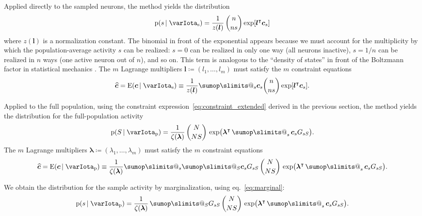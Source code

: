 \documentclass[\ifafour a4paper,12pt,\else a5paper,10pt,\fi%
onecolumn,oneside,article,%
british%
]{memoir}
\makeatletter
\theoremstyle{remark}
\theoremstyle{innote}
\def\sum{\DOTSI\sumop\slimits@}
\newcommand*{\citep}{\parencites}
\newcommand*{\defd}{\coloneqq}
\newcommand*{\pf}{\mathrm{p}}%
\newcommand*{\E}{\mathrm{E}}
\renewcommand*{\|}{\nonscript\,\vert\nonscript\;\mathopen{}}
\newcommand*{\chap}{ch.}%
\newcommand*{\eqn}{eq.}%
\newcommand*{\tsum}{\mathop{\textstyle\sum}\nolimits}
\newcommand*{\T}{^\intercal}%
\newcommand*{\ypp}{G}
\newcommand*{\yRv}{S}
\newcommand*{\yrv}{s}
\newcommand*{\yNv}{N}
\newcommand*{\yrs}{\yrv}%
\newcommand*{\yRf}{\yRv}%
\newcommand*{\yHa}{\varIota_\textrm{p}}
\newcommand*{\yHb}{\varIota_\textrm{s}}
\newcommand*{\yg}{\bm{c}}
\newcommand*{\yc}{\widehat{\bm{c}}}
\newcommand*{\yL}{\bm{\lambda}}
\newcommand*{\yl}{\bm{l}}
\newcommand*{\yk}{z}
\newcommand*{\yK}{\zeta}
\makeatother
\begin{document}
Applied directly to the sampled neurons, the method yields the distribution
\begin{equation}
  \label{eq:app_maxent_sample}
  \pf(\yrs \|\yHb)
  =\frac{1}{\yk(\yl)}\,
  \binom{n}{n\yrs}
  \exp[\yl\T \yg_{\yrs}]
\end{equation}
where $\yk(\yl)$ is a normalization constant. The binomial in front of the
exponential appears because we must account for the multiplicity by which
the population-average activity $\yrs$ can be realized: $\yrs=0$ can be
realized in only one way (all neurons inactive), $\yrs=1/n$ can be realized
in $n$ ways (one active neuron out of $n$), and so on. This term is analogous to
the \enquote{density of states} in front of the Boltzmann factor in
statistical mechanics \citep[\chap~16]{callen1960_r1985}. The $m$ Lagrange
multipliers $\yl\defd (l_1,\dotsc,l_m)$ must satisfy the $m$ constraint
equations
\begin{equation}
  \label{eq:app_maxent_sample_constraints}
  \yc = \E(\yg \|\yHb) \equiv
  \frac{1}{\yk(\yl)}\sum_{\yrs}  \yg_{\yrs} \binom{n}{n\yrs}
  \exp[\yl\T \yg_{\yrs}].%
\end{equation}

Applied to the full population, using the constraint
expression~\eqref{eq:constraint_extended} derived in the previous section,
the method yields the distribution for the full-population activity
\begin{equation}
  \label{eq:app_maxent_pop}
  \pf(\yRf \| \yHa)  = \frac{1}{\yK(\yL)}\,
  \binom{\yNv}{\yNv \yRf}\,\exp\bigl(\yL\T
  \tsum_{\yrs} \yg_{\yrs}\ypp_{\yrs\yRf}\bigr).
\end{equation}
The $m$ Lagrange multipliers $\yL\defd (\lambda_1,\dotsc,\lambda_m)$ must
satisfy the $m$ constraint equations
\begin{equation}
  \label{eq:app_maxent_pop_constraints}
  \yc = \E(\yg \|\yHa)\equiv %
 \frac{1}{\yK(\yL)}\sum_{\yrs} \sum_{\yRf} \yg_{\yrs} \ypp_{\yrs \yRf}
\,
  \binom{\yNv}{\yNv \yRf}\,\exp\bigl(\yL\T
  \tsum_{\yrs} \yg_{\yrs}\ypp_{\yrs\yRf}\bigr).
\end{equation}

We obtain the distribution for the sample activity by marginalization, using
\eqn~\eqref{eq:marginal}:
\begin{equation}
  \label{eq:app_maxent_pop_marg}
  \pf(\yrs \| \yHa)  = \frac{1}{\yK(\yL)}\, 
  \sum_{\yRf} \ypp_{\yrs \yRf}
\,
  \binom{\yNv}{\yNv \yRf}\,\exp\bigl(\yL\T
  \tsum_{\yrs} \yg_{\yrs}\ypp_{\yrs\yRf}\bigr).
\end{equation}
\end{document}
